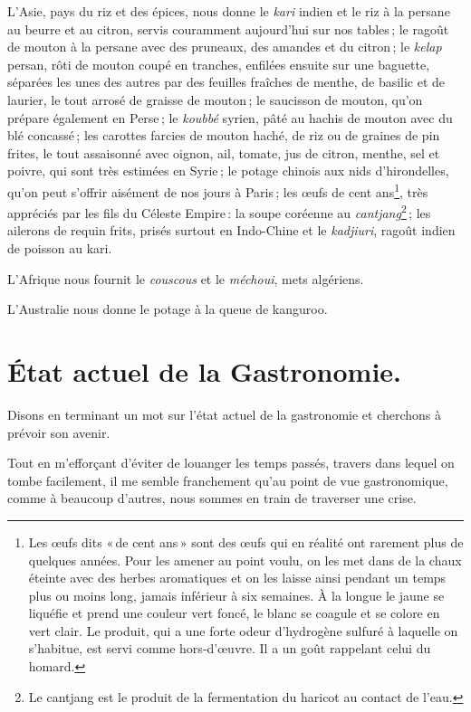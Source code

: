 L'Asie, pays du riz et des épices, nous donne le \textit{kari} indien et le riz
à la persane au beurre et au citron, servis couramment aujourd'hui sur nos
tables ; le ragoût de mouton à la persane avec des pruneaux, des amandes et du
citron ; le \textit{kelap} persan, rôti de mouton coupé en tranches, enfilées
ensuite sur une baguette, séparées les unes des autres par des feuilles
fraîches de menthe, de basilic et de laurier, le tout arrosé de graisse de
mouton ; le saucisson de mouton, qu'on prépare également en Perse ; le
\textit{koubbé} syrien, pâté au hachis de mouton avec du blé concassé ; les
carottes farcies de mouton haché, de riz ou de graines de pin frites, le tout
assaisonné avec oignon, ail, tomate, jus de citron, menthe, sel et poivre, qui
sont très estimées en Syrie ; le potage chinois aux nids d’hirondelles, qu'on
peut s'offrir aisément de nos jours à Paris ; les œufs de cent ans\footnote{Les
œufs dits « de cent ans » sont des œufs qui en réalité ont rarement plus de
quelques années. Pour les amener au point voulu, on les met dans de la chaux
éteinte avec des herbes aromatiques et on les laisse ainsi pendant un temps
plus ou moins long, jamais inférieur à six semaines. À la longue le jaune se
liquéfie et prend une couleur vert foncé, le blanc se coagule et se colore en
vert clair. Le produit, qui a une forte odeur d'hydrogène sulfuré à laquelle on
s'habitue, est servi comme hors-d'œuvre. Il a un goût rappelant celui du
homard.}, très appréciés par les fils du Céleste Empire : la soupe coréenne au
\textit{cantjang}\footnote{Le cantjang est le produit de la fermentation du
haricot au contact de l'eau.} ; les ailerons de requin frits, prisés surtout en
Indo-Chine et le \textit{kadjiuri}, ragoût indien de poisson au kari. 

L'Afrique nous fournit le \textit{couscous} et le \textit{méchoui}, mets
algériens. 

L'Australie nous donne le potage à la queue de kanguroo.

\section*{\centering  État actuel de la Gastronomie.}

Disons en terminant un mot sur l'état actuel de la gastronomie et cherchons à
prévoir son avenir.

Tout en m'efforçant d'éviter de louanger les temps passés, travers dans lequel
on tombe facilement, il me semble franchement qu'au point de vue gastronomique,
comme à beaucoup d'autres, nous sommes en train de traverser une crise.

